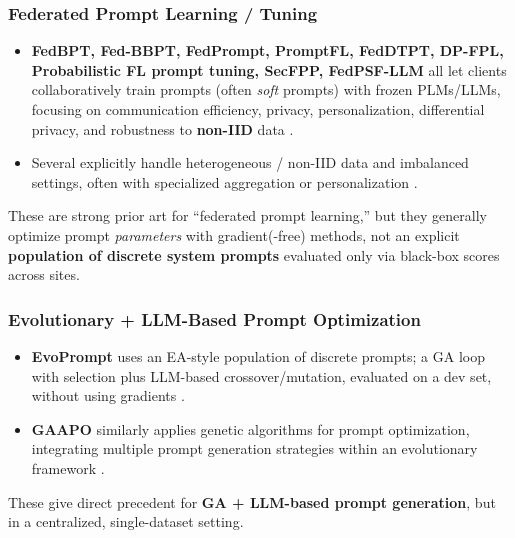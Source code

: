 \subsubsection*{\textbf{Federated Prompt Learning / Tuning}}


\begin{itemize}
\item \textbf{FedBPT, Fed-BBPT, FedPrompt, PromptFL, FedDTPT, DP-FPL, Probabilistic FL prompt tuning, SecFPP, FedPSF-LLM} all let clients collaboratively train prompts (often \textit{soft} prompts) with frozen PLMs/LLMs, focusing on communication efficiency, privacy, personalization, differential privacy, and robustness to \textbf{non-IID} data  \cite{Sun2023FedBPT:} \cite{Li2024Federated} \cite{Zhao2022FedPrompt:} \cite{Lin2023Efficient} \cite{Wu2024FedDTPT:} \cite{Tran2025Privacy-Preserving} \cite{Guo2023EvoPrompt:} \cite{Singhal2025Toward} \cite{Abdolmaleki2025Sync-GWO:}.
\item Several explicitly handle heterogeneous / non-IID data and imbalanced settings, often with specialized aggregation or personalization  \cite{Wu2024FedDTPT:} \cite{Guo2023EvoPrompt:} \cite{Singhal2025Toward} \cite{Abdolmaleki2025Sync-GWO:}.
\end{itemize}


These are strong prior art for “federated prompt learning,” but they generally optimize prompt \textit{parameters} with gradient(-free) methods, not an explicit \textbf{population of discrete system prompts} evaluated only via black-box scores across sites.


\subsubsection*{\textbf{Evolutionary + LLM-Based Prompt Optimization}}


\begin{itemize}
\item \textbf{EvoPrompt} uses an EA-style population of discrete prompts; a GA loop with selection plus LLM-based crossover/mutation, evaluated on a dev set, without using gradients  \cite{Weng2025Probabilistic} \cite{Guo2022PromptFL:}.
\item \textbf{GAAPO} similarly applies genetic algorithms for prompt optimization, integrating multiple prompt generation strategies within an evolutionary framework  \cite{S'echeresse2025GAAPO:}.
\end{itemize}


These give direct precedent for \textbf{GA + LLM-based prompt generation}, but in a centralized, single-dataset setting.


